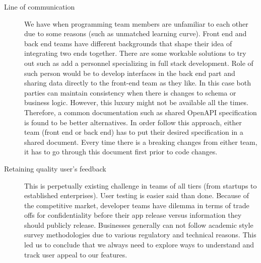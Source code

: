 \begin{description}
	\item[Line of communication] We have  when programming team members are unfamiliar to each other due to some reasons (such as unmatched learning curve). Front end and back end teams have different backgrounds that shape their idea of integrating two ends together. There are some workable solutions to try out such as add a personnel specializing in full stack development. Role of such person would be to develop interfaces in the back end part and sharing data directly to the front-end team as they like. In this case both parties can maintain consistency when there is changes to schema or business logic. However, this luxury might not be available all the times. Therefore, a common documentation such as shared OpenAPI specification \cite{2024_OpenAPI3.0} is found to be better alternatives. In order follow this approach, either team (front end or back end) has to put their desired specification in a shared document. Every time there is a breaking changes from either team, it has to go through this document first prior to code changes.
	
	\item[Retaining quality user's feedback] This is perpetually existing challenge in teams of all tiers (from startups to established enterprises). User testing is easier said than done. Because of the competitive market, developer teams have dilemma in terms of trade offs for confidentiality before their app release versus information they should publicly release. Businesses generally can not follow academic style survey methodologies due to various regulatory and technical reasons. This led us to conclude that we always need to explore ways to understand and track user appeal to our features.
\end{description}

\clearpage